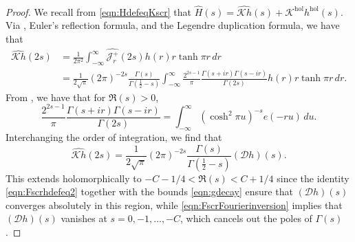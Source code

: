 \documentclass[11pt,a4paper]{amsart}
\newcommand{\Dscr}{\mathscr{D}}
\newcommand{\hol}{\mathrm{hol}}
\newcommand{\JJ}{\mathcal{J}}
\newcommand{\Kscr}{\mathscr{K}}
\numberwithin{equation}{section}
\theoremstyle{remark}
\theoremstyle{definition}
\begin{document}
\begin{proof}
We recall from \eqref{eqn:HdefeqKscr} that $\widehat{H}(s) = \widehat{\Kscr h}(s) + \widehat{\Kscr^{\hol} h^{\hol}}(s)$. Via \cite[(3.13)]{BK19}, Euler's reflection formula, and the Legendre duplication formula, we have that
\begin{align*}
\widehat{\Kscr h}(2s) & = \frac{1}{2\pi^2} \int_{-\infty}^{\infty} \widehat{\JJ_r^+}(2s) h(r) r \tanh \pi r \, dr	\\
& = \frac{1}{2\sqrt{\pi}} (2\pi)^{-2s} \frac{\Gamma(s)}{\Gamma\left(\frac{1}{2} - s\right)} \int_{-\infty}^{\infty} \frac{2^{2s - 1}}{\pi} \frac{\Gamma(s + ir) \Gamma(s - ir)}{\Gamma(2s)} h(r) r \tanh \pi r \, dr.
\end{align*}
From \cite[3.985.1]{GR15}, we have that for $\Re(s) > 0$,
\[\frac{2^{2s - 1}}{\pi} \frac{\Gamma(s + ir) \Gamma(s - ir)}{\Gamma(2s)} = \int_{-\infty}^{\infty} (\cosh^2 \pi u)^{-s} e(-ru) \, du.\]
Interchanging the order of integration, we find that
\[\widehat{\Kscr h}(2s) = \frac{1}{2\sqrt{\pi}} (2\pi)^{-2s} \frac{\Gamma(s)}{\Gamma\left(\frac{1}{2} - s\right)} (\Dscr h)(s).\]
This extends holomorphically to $-C - 1/4 < \Re(s) < C + 1/4$ since the identity \eqref{eqn:Fscrhdefeq2} together with the bounds \eqref{eqn:gdecay} ensure that $(\Dscr h)(s)$ converges absolutely in this region, while \eqref{eqn:FscrFourierinversion} implies that $(\Dscr h)(s)$ vanishes at $s = 0,-1,\ldots,-C$, which cancels out the poles of $\Gamma(s)$.


\end{proof}
\end{document}
